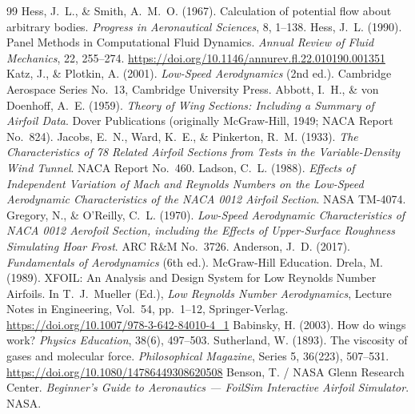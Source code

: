 \documentclass[10pt,a4paper]{article}
\begin{document}
\begin{thebibliography}{99}
\setlength{\itemsep}{3pt}\setlength{\parskip}{0pt}
\small
{} Hess, J.\ L., \& Smith, A.\ M.\ O. (1967). Calculation of potential flow about arbitrary bodies. \textit{Progress in Aeronautical Sciences}, 8, 1--138.
 Hess, J.\ L. (1990). Panel Methods in Computational Fluid Dynamics. \textit{Annual Review of Fluid Mechanics}, 22, 255--274. \url{https://doi.org/10.1146/annurev.fl.22.010190.001351}
 Katz, J., \& Plotkin, A. (2001). \textit{Low-Speed Aerodynamics} (2nd ed.). Cambridge Aerospace Series No.\ 13, Cambridge University Press.
 Abbott, I.\ H., \& von Doenhoff, A.\ E. (1959). \textit{Theory of Wing Sections: Including a Summary of Airfoil Data}. Dover Publications (originally McGraw-Hill, 1949; NACA Report No.\ 824).
 Jacobs, E.\ N., Ward, K.\ E., \& Pinkerton, R.\ M. (1933). \textit{The Characteristics of 78 Related Airfoil Sections from Tests in the Variable-Density Wind Tunnel}. NACA Report No.\ 460.
 Ladson, C.\ L. (1988). \textit{Effects of Independent Variation of Mach and Reynolds Numbers on the Low-Speed Aerodynamic Characteristics of the NACA 0012 Airfoil Section}. NASA TM-4074.
 Gregory, N., \& O'Reilly, C.\ L. (1970). \textit{Low-Speed Aerodynamic Characteristics of NACA 0012 Aerofoil Section, including the Effects of Upper-Surface Roughness Simulating Hoar Frost}. ARC R\&M No.\ 3726.
 Anderson, J.\ D. (2017). \textit{Fundamentals of Aerodynamics} (6th ed.). McGraw-Hill Education.
 Drela, M. (1989). XFOIL: An Analysis and Design System for Low Reynolds Number Airfoils. In T.\ J.\ Mueller (Ed.), \textit{Low Reynolds Number Aerodynamics}, Lecture Notes in Engineering, Vol.\ 54, pp.\ 1--12, Springer-Verlag. \url{https://doi.org/10.1007/978-3-642-84010-4_1}
 Babinsky, H. (2003). How do wings work? \textit{Physics Education}, 38(6), 497--503.
 Sutherland, W. (1893). The viscosity of gases and molecular force. \textit{Philosophical Magazine}, Series 5, 36(223), 507--531. \url{https://doi.org/10.1080/14786449308620508}
 Benson, T. / NASA Glenn Research Center. \textit{Beginner's Guide to Aeronautics --- FoilSim Interactive Airfoil Simulator}. NASA.
\end{thebibliography}
\endgroup
\end{document}
